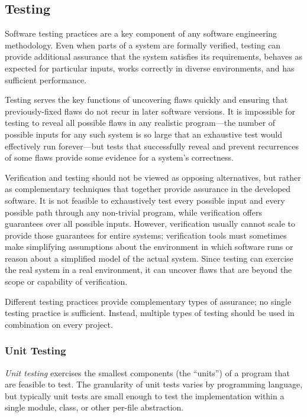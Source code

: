 \subsection{Testing}

Software testing practices are a key component of any software
engineering methodology. Even when parts of a system are formally
verified, testing can provide additional assurance that the system
satisfies its requirements, behaves as expected for particular inputs,
works correctly in diverse environments, and has sufficient
performance.

Testing serves the key functions of uncovering flaws quickly and
ensuring that previously-fixed flaws do not recur in later software
versions. It is impossible for testing to reveal all possible flaws in
any realistic program---the number of possible inputs for any such
system is so large that an exhaustive test would effectively run
forever---but tests that successfully reveal and prevent recurrences
of some flaws provide some evidence for a system's correctness.

Verification and testing should not be viewed as opposing
alternatives, but rather as complementary techniques that together
provide assurance in the developed software. It is not feasible to
exhaustively test every possible input and every possible path through
any non-trivial program, while verification offers guarantees over all
possible inputs. However, verification usually cannot scale to provide
those guarantees for entire systems; verification tools must sometimes
make simplifying assumptions about the environment in which software
runs or reason about a simplified model of the actual system. Since
testing can exercise the real system in a real environment, it can
uncover flaws that are beyond the scope or capability of verification.

Different testing practices provide complementary types of assurance;
no single testing practice is sufficient. Instead, multiple types of
testing should be used in combination on every project.

\subsubsection{Unit Testing}

\emph{Unit testing} exercises the smallest components (the ``units'')
of a program that are feasible to test. The granularity of unit tests
varies by programming language, but typically unit tests are small
enough to test the implementation within a single module, class, or
other per-file abstraction.


